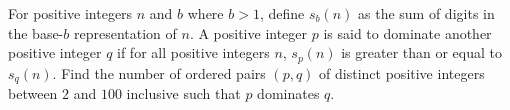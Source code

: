 For positive integers $n$ and $b$ where $b > 1$, define $s_b(n)$ as the sum of digits in the base-$b$ representation of $n$. A positive integer $p$ is said to dominate another positive integer $q$ if for all positive integers $n$, $s_p(n)$ is greater than or equal to $s_q(n)$. Find the number of ordered pairs $(p, q)$ of distinct positive integers between $2$ and $100$ inclusive such that $p$ dominates $q$.
